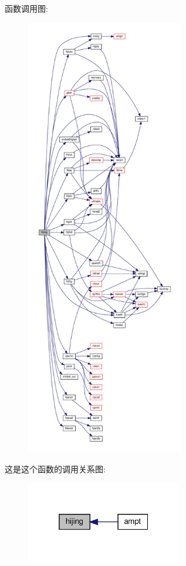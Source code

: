 函数调用图\+:
\nopagebreak
\begin{figure}[H]
\begin{center}
\leavevmode
\includegraphics[height=550pt]{hijing_8f90_ad51fb6c82b6ffec874fa7794fa5ea822_cgraph}
\end{center}
\end{figure}
这是这个函数的调用关系图\+:
\nopagebreak
\begin{figure}[H]
\begin{center}
\leavevmode
\includegraphics[width=193pt]{hijing_8f90_ad51fb6c82b6ffec874fa7794fa5ea822_icgraph}
\end{center}
\end{figure}
